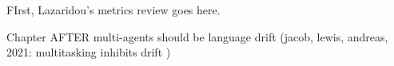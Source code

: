 FIrst, Lazaridou's metrics review goes here.

Chapter AFTER multi-agents should be language drift (jacob, lewis, andreas, 2021: multitasking inhibits drift )